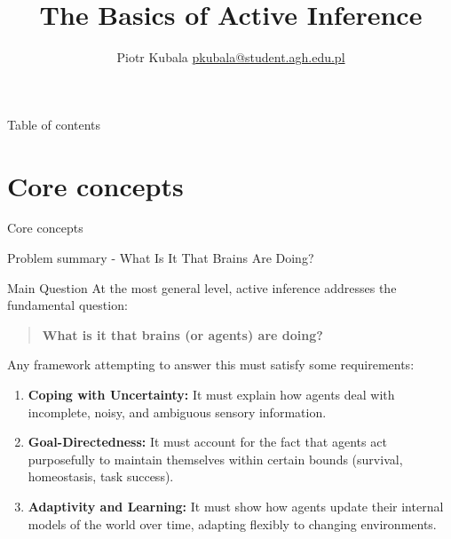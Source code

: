 \documentclass[aspectratio=1610, english]{beamer}
\author[Piotr Kubala]{Piotr Kubala\newline
   {\scriptsize \href{mailto:pkubala@student.agh.edu.pl}{pkubala@student.agh.edu.pl}}
}
\date{}
\title{The Basics of Active Inference}
\institute[AGH]{
}
\begin{document}
\maketitle

\ifdefined\textleftmargin

\fi

\begin{frame}{Table of contents}
    \tableofcontents
\end{frame}

\section{Core concepts}
\begin{frame}{Core concepts}
    \sectionpage
\end{frame}

\begin{frame}{Problem summary - What Is It That Brains Are Doing?}
    \begin{block}{Main Question}
        At the most general level, active inference addresses the fundamental question:
        \begin{quote}
            \textbf{What is it that brains (or agents) are doing?}
        \end{quote}
    \end{block}
    
    Any framework attempting to answer this must satisfy some requirements:
    \begin{enumerate}
        \item \textbf{Coping with Uncertainty:} It must explain how agents deal with incomplete, noisy, and ambiguous sensory information.
        \item \textbf{Goal-Directedness:} It must account for the fact that agents act purposefully to maintain themselves within certain bounds (survival, homeostasis, task success).
        \item \textbf{Adaptivity and Learning:} It must show how agents update their internal models of the world over time, adapting flexibly to changing environments.
    \end{enumerate}
\end{frame}
\end{document}
